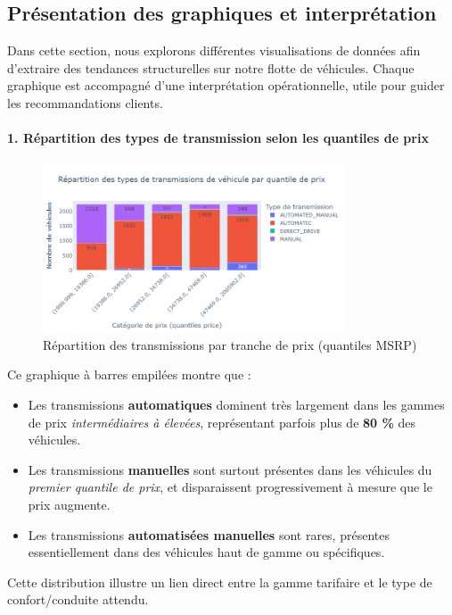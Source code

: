 \documentclass[12pt]{report}
\begin{document}
\subsection{Présentation des graphiques et interprétation}

Dans cette section, nous explorons différentes visualisations de données afin d’extraire des tendances structurelles sur notre flotte de véhicules. Chaque graphique est accompagné d’une interprétation opérationnelle, utile pour guider les recommandations clients.

\paragraph{1. Répartition des types de transmission selon les quantiles de prix}\mbox{}

\begin{figure}[H]
\centering
\includegraphics[width=0.8\textwidth]{transmission_vs_price.png}
\caption{Répartition des transmissions par tranche de prix (quantiles MSRP)}
\end{figure}


Ce graphique à barres empilées montre que :
\begin{itemize}
  \item Les transmissions \textbf{automatiques} dominent très largement dans les gammes de prix \textit{intermédiaires à élevées}, représentant parfois plus de \textbf{80 \%} des véhicules.
  \item Les transmissions \textbf{manuelles} sont surtout présentes dans les véhicules du \textit{premier quantile de prix}, et disparaissent progressivement à mesure que le prix augmente.
  \item Les transmissions \textbf{automatisées manuelles} sont rares, présentes essentiellement dans des véhicules haut de gamme ou spécifiques.
\end{itemize}

Cette distribution illustre un lien direct entre la gamme tarifaire et le type de confort/conduite attendu.
\end{document}
